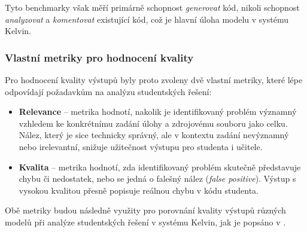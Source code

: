 Tyto benchmarky však měří primárně schopnost \textit{generovat} kód, nikoli schopnost \textit{analyzovat} a \textit{komentovat} existující kód, což je hlavní úloha modelu v systému Kelvin.

\subsubsection*{Vlastní metriky pro hodnocení kvality}
\label{subsubsec:criteria-quality-metrics}

Pro hodnocení kvality výstupů byly proto zvoleny dvě vlastní metriky, které lépe odpovídají požadavkům na analýzu studentských řešení:

\begin{itemize}
    \item \textbf{Relevance} -- metrika hodnotí, nakolik je identifikovaný problém významný vzhledem ke konkrétnímu zadání úlohy a zdrojovému souboru jako celku.
    Nález, který je sice technicky správný, ale v kontextu zadání nevýznamný nebo irelevantní, snižuje užitečnost výstupu pro studenta i učitele.

    \item \textbf{Kvalita} -- metrika hodnotí, zda identifikovaný problém skutečně představuje chybu či nedostatek, nebo se jedná o falešný nález (\textit{false positive}).
    Výstup s vysokou kvalitou přesně popisuje reálnou chybu v kódu studenta.
\end{itemize}

Obě metriky budou následně využity pro porovnání kvality výstupů různých modelů při analýze studentských řešení v systému Kelvin, jak je popsáno v .

\endinput